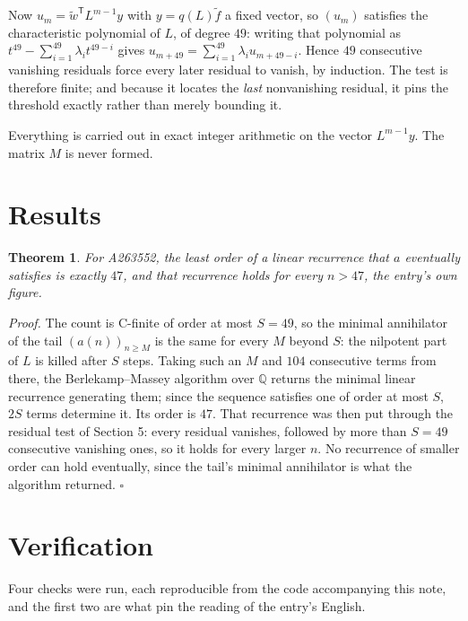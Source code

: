 \documentclass[11pt]{article}
\newtheorem{theorem}{Theorem}
\theoremstyle{definition}
\begin{document}
Now $u_m = \tilde w^{\mathsf T} L^{m-1} y$ with $y = q(L)\tilde f$ a fixed vector, so $(u_m)$ satisfies the characteristic polynomial of $L$, of degree $49$: writing that polynomial as $t^{49} - \sum_{i=1}^{49} \lambda_i t^{49-i}$ gives $u_{m+49} = \sum_{i=1}^{49} \lambda_i u_{m+49-i}$. Hence $49$ consecutive vanishing residuals force every later residual to vanish, by induction. The test is therefore finite; and because it locates the {\itshape last} nonvanishing residual, it pins the threshold exactly rather than merely bounding it.

Everything is carried out in exact integer arithmetic on the vector $L^{m-1}y$. The matrix $M$ is never formed.

\section{Results}

\begin{theorem} For A263552, the least order of a linear recurrence that $a$ eventually satisfies is exactly $47$, and that recurrence holds for every $n > 47$, the entry's own figure.\end{theorem}

{\itshape Proof.} The count is C-finite of order at most $S = 49$, so the minimal annihilator of the tail $(a(n))_{n \ge M}$ is the same for every $M$ beyond $S$: the nilpotent part of $L$ is killed after $S$ steps. Taking such an $M$ and $104$ consecutive terms from there, the Berlekamp--Massey algorithm over $\mathbb{Q}$ returns the minimal linear recurrence generating them; since the sequence satisfies one of order at most $S$, $2S$ terms determine it. Its order is $47$. That recurrence was then put through the residual test of Section 5: every residual vanishes, followed by more than $S = 49$ consecutive vanishing ones, so it holds for every larger $n$. No recurrence of smaller order can hold eventually, since the tail's minimal annihilator is what the algorithm returned. $\square$

\section{Verification}

Four checks were run, each reproducible from the code accompanying this note, and the first two are what pin the reading of the entry's English.
\end{document}
